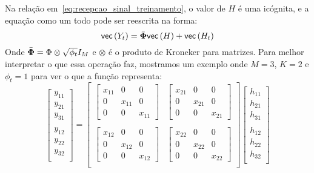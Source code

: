 \documentclass{article}
\begin{document}
	Na relação em~\eqref{eq:recepcao_sinal_treinamento}, o valor de $H$ é uma icógnita, e a equação como um todo pode ser reescrita na forma:
	\begin{equation}
		 \mathsf{vec} \left( Y_t \right) =\bar{\boldsymbol{\Phi}} \mathsf{vec} \left( H \right) + \mathsf{vec} \left( H_t \right) 
		\label{eq:equacao_estimacao_canal}
	\end{equation}		
	Onde $\bar{\boldsymbol{\Phi}}=\Phi\otimes\sqrt{\phi_t}I_M$ e $\otimes$ é o produto de Kroneker para matrizes. Para melhor interpretar o que essa operação faz, mostramos um exemplo onde $M=3$, $K=2$ e $\phi_t=1$ para ver o que a função representa:
	\begin{equation}
		\begin{bmatrix}
			y_{11}\\
			y_{21}\\
			y_{31}\\ 
			\\ 
			y_{12}\\
			y_{22}\\
			y_{32}\\
		\end{bmatrix} 
		= 
		\begin{bmatrix}
			\begin{bmatrix}
				x_{11}&0&0\\
				0&x_{11}&0\\ 
				0&0&x_{11}
			\end{bmatrix} & \begin{bmatrix}
				x_{21}&0&0\\
				0&x_{21}&0\\ 
				0&0&x_{21} 
			\end{bmatrix} \\
			\\ 
			\begin{bmatrix}
				x_{12}&0&0\\
				0&x_{12}&0\\ 
				0&0&x_{12}
			\end{bmatrix} & \begin{bmatrix}
				x_{22}&0&0\\
				0&x_{22}&0\\ 
				0&0&x_{22} 
			\end{bmatrix} \\
		\end{bmatrix}
		\begin{bmatrix}
			h_{11}\\
			h_{21}\\
			h_{31}\\
			\\ 
			h_{12}\\
			h_{22}\\
			h_{32}\\
		\end{bmatrix}
	\end{equation}
\end{document}
